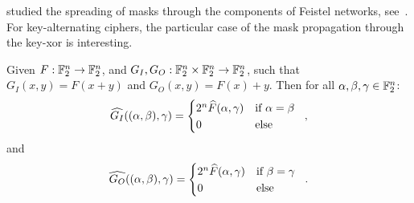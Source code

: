 \citeauthor{EC:Matsui94} studied the spreading of masks through the components of Feistel networks, see~\cite[Section~3 and Fig.~3]{EC:Matsui94}.
For key-alternating ciphers, the particular case of the mask propagation through the key-xor is interesting.
\begin{lemma}\label{lem:comp-xor}
    Given $F : \mathbb{F}_2^n \to \mathbb{F}_2^n$, and $G_I, G_O : \mathbb{F}_2^n \times \mathbb{F}_2^n \to \mathbb{F}_2^n$, such that $G_I(x, y) = F(x + y)$ and $G_O(x, y) = F(x) + y$.
    Then for all $\alpha, \beta, \gamma \in \mathbb{F}_2^n$:
    \begin{equation*}
        \FC{G_I}((\alpha, \beta), \gamma) = \begin{cases*}
            2^n \FC{F}(\alpha, \gamma) & if $\alpha = \beta$ \\
            0                          & else
        \end{cases*}\;,
    \end{equation*}
    and
    \begin{equation*}
        \FC{G_O}((\alpha, \beta), \gamma) = \begin{cases*}
            2^n \FC{F}(\alpha, \gamma) & if $\beta = \gamma$ \\
            0                          & else
        \end{cases*}\;.
    \end{equation*}
\end{lemma}
